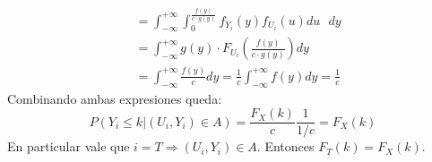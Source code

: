 \begin{enumerate}
\begin{align*}
								& = \int_{-\infty}^{+\infty}\int_{0}^{\frac{f(y)}{c\cdot g(y)}} f_{Y_i}(y)f_{U_i}(u) du\text{ }dy	\\
								& = \int_{-\infty}^{+\infty}g(y)\cdot F_{U_i}\left(\frac{f(y)}{c\cdot g(y)}\right) dy				\\
								& = \int_{-\infty}^{+\infty}\frac{f(y)}{c} dy = \frac{1}{c} \int_{-\infty}^{+\infty}f(y) dy	= \frac{1}{c}
		\end{align*}
		Combinando ambas expresiones queda:
		$$P(Y_i \leq k | (U_i, Y_i) \in A) = \frac{F_X(k)}{c} \frac{1}{1/c} = F_X(k)$$
		En particular vale que $i=T \Rightarrow (U_i, Y_i) \in A$.
		Entonces $F_T(k) = F_X(k)$.
\end{enumerate}

